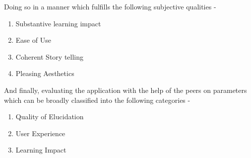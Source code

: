 Doing so in a manner which fulfills the following subjective qualities -

\begin{enumerate}
\item Substantive learning impact
\item Ease of Use
\item Coherent Story telling
\item Pleasing Aesthetics
\end{enumerate}

And finally, evaluating the application with the help of the peers on parameters which can be broadly classified into the following categories -

\begin{enumerate}
\item Quality of Elucidation
\item User Experience 
\item Learning Impact
\end{enumerate}
